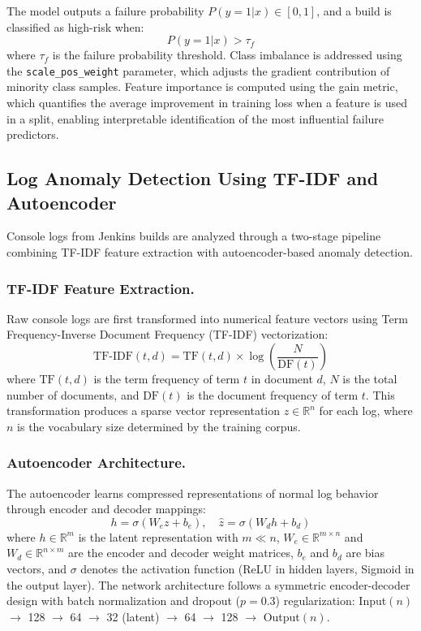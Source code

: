 \documentclass[sn-nature]{sn-jnl}
\theoremstyle{thmstyleone}
\theoremstyle{thmstyletwo}
\theoremstyle{thmstylethree}
\begin{document}
The model outputs a failure probability $P(y=1|x) \in [0, 1]$, and a build is classified as high-risk when:
\begin{equation}
P(y=1|x) > \tau_f
\end{equation}
where $\tau_f$ is the failure probability threshold. Class imbalance is addressed using the \texttt{scale\_pos\_weight} parameter, which adjusts the gradient contribution of minority class samples. Feature importance is computed using the gain metric, which quantifies the average improvement in training loss when a feature is used in a split, enabling interpretable identification of the most influential failure predictors.

\subsection{Log Anomaly Detection Using TF-IDF and Autoencoder}\label{subsec:loganomaly}

Console logs from Jenkins builds are analyzed through a two-stage pipeline combining TF-IDF feature extraction with autoencoder-based anomaly detection.

\subsubsection{TF-IDF Feature Extraction.}
Raw console logs are first transformed into numerical feature vectors using Term Frequency-Inverse Document Frequency (TF-IDF) vectorization:
\begin{equation}
\text{TF-IDF}(t,d) = \text{TF}(t,d) \times \log \left(\frac{N}{\text{DF}(t)}\right)
\end{equation}
where $\text{TF}(t,d)$ is the term frequency of term $t$ in document $d$, $N$ is the total number of documents, and $\text{DF}(t)$ is the document frequency of term $t$. This transformation produces a sparse vector representation $z \in \mathbb{R}^n$ for each log, where $n$ is the vocabulary size determined by the training corpus.

\subsubsection{Autoencoder Architecture.}
The autoencoder learns compressed representations of normal log behavior through encoder and decoder mappings:
\begin{equation}
h = \sigma(W_e z + b_e), \quad \hat{z} = \sigma(W_d h + b_d)
\end{equation}
where $h \in \mathbb{R}^m$ is the latent representation with $m \ll n$, $W_e \in \mathbb{R}^{m \times n}$ and $W_d \in \mathbb{R}^{n \times m}$ are the encoder and decoder weight matrices, $b_e$ and $b_d$ are bias vectors, and $\sigma$ denotes the activation function (ReLU in hidden layers, Sigmoid in the output layer). The network architecture follows a symmetric encoder-decoder design with batch normalization and dropout ($p=0.3$) regularization: Input$(n)$ $\rightarrow$ 128 $\rightarrow$ 64 $\rightarrow$ 32 (latent) $\rightarrow$ 64 $\rightarrow$ 128 $\rightarrow$ Output$(n)$.
\end{document}
